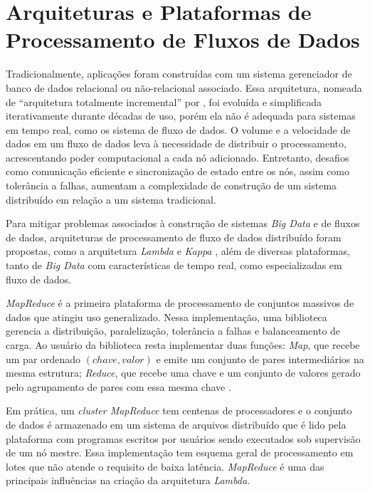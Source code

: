 \section{Arquiteturas e Plataformas de Processamento de Fluxos de Dados}
\label{sec:frameworks}

Tradicionalmente, aplicações
foram construídas com um sistema gerenciador de
banco de dados relacional ou não-relacional associado.
Essa arquitetura,
nomeada de ``arquitetura totalmente incremental'' por ,
foi evoluída e simplificada iterativamente durante décadas de uso, porém ela não
é adequada para sistemas em tempo real, como os sistema de fluxo de dados.
O volume e a velocidade de dados em um fluxo de dados leva à necessidade de
distribuir o processamento, acrescentando poder computacional a cada nó
adicionado.
Entretanto, desafios como comunicação eficiente e sincronização de estado
entre os nós, assim como tolerância a falhas, aumentam a complexidade de
construção de um sistema distribuído em relação a um sistema tradicional.

\newcommand{\lambdaa}{\xspace\emph{Lambda}\xspace}
\newcommand{\kappaa}{\xspace\emph{Kappa}\xspace}

Para mitigar problemas associados à construção de sistemas \emph{Big Data} e de
fluxos de dados, arquiteturas de processamento de fluxo de dados distribuído
foram propostas, como a arquitetura \lambdaa \cite{marz2015big} e \kappaa
\cite{Kreps2014}, além de diversas plataformas, tanto de \emph{Big Data} com
características de tempo real, como especializadas em fluxo de dados.

\emph{MapReduce} é a primeira plataforma de processamento de conjuntos massivos
de dados que atingiu uso generalizado.
Nessa implementação, uma biblioteca gerencia a distribuição, paralelização,
tolerância a falhas e balanceamento de carga.
Ao usuário da biblioteca resta implementar duas funções:
\emph{Map}, que recebe um par ordenado
$(chave, valor)$ e emite um conjunto de pares intermediários na mesma estrutura;
\emph{Reduce}, que recebe uma chave e um conjunto de valores gerado pelo agrupamento
de pares com essa mesma chave \cite{Dean2004}.

Em prática, um \emph{cluster MapReduce} tem centenas de processadores e o
conjunto de dados é armazenado em um sistema de arquivos distribuído que é lido
pela plataforma com programas escritos por usuários sendo executados sob
supervisão de um nó mestre.
Essa implementação tem esquema geral de processamento em lotes que não atende o
requisito de baixa latência.
\nobreakdash \emph{MapReduce} é uma das principais influências na criação da arquitetura \lambdaa \cite{marz2015big}.

